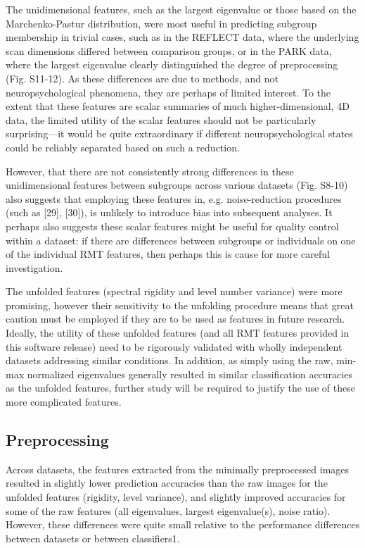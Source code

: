 The unidimensional features, such as the largest eigenvalue or those based on the Marchenko-Pastur
distribution, were most useful in predicting subgroup membership in trivial cases, such as in the
REFLECT data, where the underlying scan dimensions differed between comparison groups, or in the
PARK data, where the largest eigenvalue clearly distinguished the degree of preprocessing (Fig.
S11-12). As these differences are due to methods, and not neuropsychological phenomena, they are
perhaps of limited interest. To the extent that these features are scalar summaries of much
higher-dimensional, 4D data, the limited utility of the scalar features should not be particularly
surprising—it would be quite extraordinary if different neuropsychological states could be reliably
separated based on such a reduction.

However, that there are not consistently strong differences in these unidimensional features between
subgroups across various datasets (Fig. S8-10) also suggests that employing these features in, e.g.
noise-reduction procedures (such as [29], [30]), is unlikely to introduce bias into subsequent
analyses. It perhaps also suggests these scalar features might be useful for quality control within
a dataset: if there are differences between subgroups or individuals on one of the individual RMT
features, then perhaps this is cause for more careful investigation.

The unfolded features (spectral rigidity and level number variance) were more promising, however
their sensitivity to the unfolding procedure means that great caution must be employed if they are
to be used as features in future research. Ideally, the utility of these unfolded features (and all
RMT features provided in this software release) need to be rigorously validated with wholly
independent datasets addressing similar conditions. In addition, as simply using the raw, min-max
normalized eigenvalues generally resulted in similar classification accuracies as the unfolded
features, further study will be required to justify the use of these more complicated features.

\subsection{Preprocessing}
Across datasets, the features extracted from the minimally preprocessed images resulted in slightly
lower prediction accuracies than the raw images for the unfolded features (rigidity, level
variance), and slightly improved accuracies for some of the raw features (all eigenvalues, largest
eigenvalue(s), noise ratio). However, these differences were quite small relative to the performance
differences between datasets or between classifiers1.

